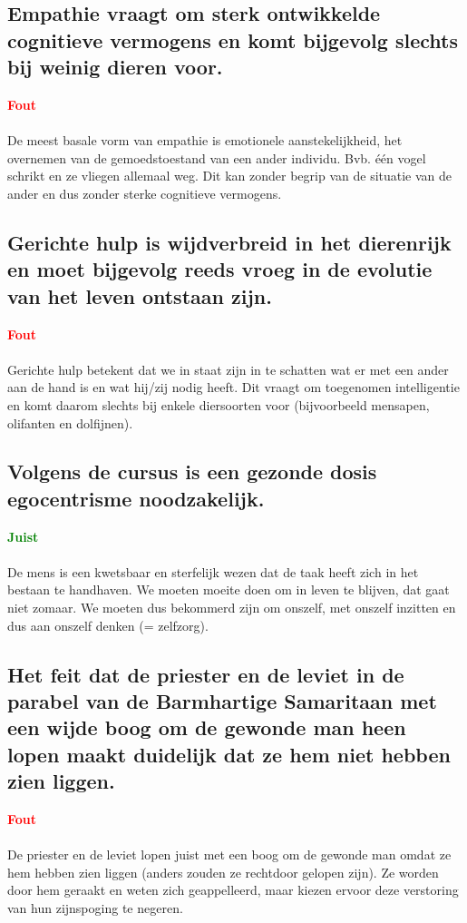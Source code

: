 \documentclass[11pt,a4paper,titlepage]{article}
\begin{document}
\subsection{Empathie vraagt om sterk ontwikkelde cognitieve vermogens en komt bijgevolg slechts bij weinig dieren voor.}
\textcolor{red}{\textbf{Fout}}\\\\
De meest basale vorm van empathie is emotionele aanstekelijkheid, het overnemen van de gemoedstoestand van een ander individu. Bvb. één vogel schrikt en ze vliegen allemaal weg. Dit kan zonder begrip van de situatie van de ander en dus zonder sterke cognitieve vermogens.

\subsection{Gerichte hulp is wijdverbreid in het dierenrijk en moet bijgevolg reeds vroeg in de evolutie van het leven ontstaan zijn.}
\textcolor{red}{\textbf{Fout}}\\\\
Gerichte hulp betekent dat we in staat zijn in te schatten wat er met een ander aan de hand is en wat hij/zij nodig heeft. Dit vraagt om toegenomen intelligentie en komt daarom slechts bij enkele diersoorten voor (bijvoorbeeld mensapen, olifanten en dolfijnen).

\subsection{Volgens de cursus is een gezonde dosis egocentrisme noodzakelijk.}
\textcolor{green}{\textbf{Juist}}\\\\
De mens is een kwetsbaar en sterfelijk wezen dat de taak heeft zich in het bestaan te handhaven. We moeten moeite doen om in leven te blijven, dat gaat niet zomaar. We moeten dus bekommerd zijn om onszelf, met onszelf inzitten en dus aan onszelf denken (= zelfzorg).

\subsection{Het feit dat de priester en de leviet in de parabel van de Barmhartige Samaritaan met een wijde boog om de gewonde man heen lopen maakt duidelijk dat ze hem niet hebben zien liggen.}
\textcolor{red}{\textbf{Fout}}\\\\
De priester en de leviet lopen juist met een boog om de gewonde man omdat ze hem hebben zien liggen (anders zouden ze rechtdoor gelopen zijn). Ze worden door hem geraakt en weten zich geappelleerd, maar kiezen ervoor deze verstoring van hun zijnspoging te negeren.
\end{document}
